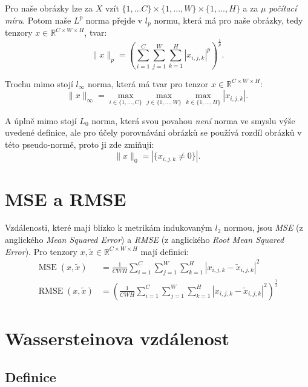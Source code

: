 \documentclass[czech]{article}
\begin{document}
Pro naše obrázky lze za $X$ vzít $\{1, ... C\} \times \{1, ..., W\} \times \{1, ..., H\}$ a za $\mu$ \emph{počítací míru}.
Potom naše $L^p$ norma přejde v $l_p$ normu, která má pro naše obrázky, tedy tenzory $x \in \mathbb{R}^{C \times W \times H}$, tvar:
\begin{equation}
    \|x\|_p = \left( \sum_{i=1}^{C} \sum_{j=1}^{W} \sum_{k=1}^{H} |x_{i, j, k}|^p \right)^{\frac{1}{p}}.
\end{equation}

Trochu mimo stojí $l_{\infty}$ norma, která má tvar pro tenzor $x \in \mathbb{R}^{C \times W \times H}$:
\begin{equation}
    \|x\|_\infty = \max_{i \in \{1, ..., C\}} \max_{j \in \{1, ..., W\}} \max_{k \in \{1, ..., H\}} |x_{i, j, k}|.
\end{equation}

A úplně mimo stojí $L_0$ norma, která svou povahou \emph{není} norma ve smyslu výše uvedené definice,
ale pro účely porovnávání obrázků se používá rozdíl obrázků v této pseudo-normě, proto ji zde zmiňuji:
\begin{equation}
    \|x\|_0 = |\{x_{i, j, k} \neq 0\}|.
\end{equation}

\section{MSE a RMSE}

Vzdálenosti, které mají blízko k metrikám indukovaným $l_2$ normou, jsou \emph{MSE} (z anglického \emph{Mean Squared Error})
a \emph{RMSE} (z anglického \emph{Root Mean Squared Error}).
Pro tenzory $x, \tilde{x} \in \mathbb{R}^{C \times W \times H}$ mají definici:
\begin{align}
    \operatorname{MSE}(x, \tilde{x}) &= \frac{1}{C W H} \sum_{i=1}^C \sum_{j=1}^W \sum_{k=1}^H | x_{i, j, k} - \tilde{x}_{i, j, k} |^2 \\
    \operatorname{RMSE}(x, \tilde{x}) &= \left(\frac{1}{C W H} \sum_{i=1}^C \sum_{j=1}^W \sum_{k=1}^H | x_{i, j, k} - \tilde{x}_{i, j, k} |^2 \right)^{\frac{1}{2}}
\end{align}

\section{Wassersteinova vzdálenost}

\subsection{Definice}
\end{document}
